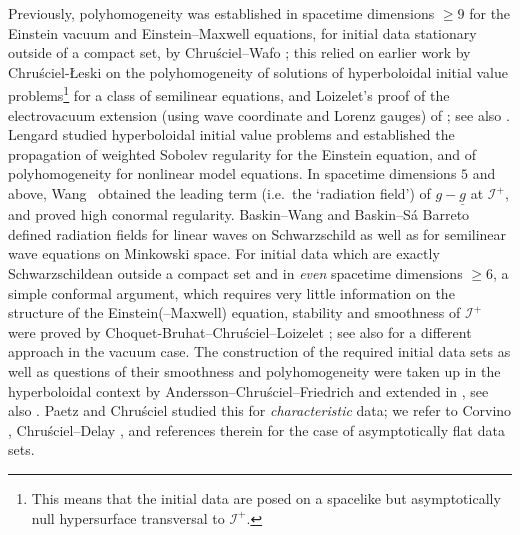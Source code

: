 \documentclass[reqno,11pt,letterpaper]{amsart}
\numberwithin{equation}{section}
\numberwithin{figure}{section}
\theoremstyle{definition}
\theoremstyle{remark}
\newcommand{\ms}{\mathscr}
\newcommand{\scri}{\ms I}
\newcommand{\ul}[1]{\underline{#1}{}}
\begin{document}
Previously, polyhomogeneity was established in spacetime dimensions $\geq 9$ for the Einstein vacuum and Einstein--Maxwell equations, for initial data stationary outside of a compact set, by Chru\'sciel--Wafo \cite{ChruscielWafoPhg}; this relied on earlier work by Chru\'sciel-\L{}eski \cite{ChruscielLeskiPolyhomogeneous} on the polyhomogeneity of solutions of hyperboloidal initial value problems\footnote{This means that the initial data are posed on a spacelike but asymptotically null hypersurface transversal to $\scri^+$.} for a class of semilinear equations, and Loizelet's proof \cite{LoizeletPhD,LoizeletEinsteinMaxwell} of the electrovacuum extension (using wave coordinate and Lorenz gauges) of \cite{LindbladRodnianskiGlobalExistence}; see also \cite{BeigChruscielElectroVac}. Lengard \cite{LengardThesis} studied hyperboloidal initial value problems and established the propagation of weighted Sobolev regularity for the Einstein equation, and of polyhomogeneity for nonlinear model equations. In spacetime dimensions $5$ and above, Wang~\cite{WangThesis,WangRadiation} obtained the leading term (i.e.\ the `radiation field') of $g-\ul g$ at $\scri^+$, and proved high conormal regularity. Baskin--Wang \cite{BaskinWangRad} and Baskin--S\'a Barreto \cite{BaskinSaBarretoRad} defined radiation fields for linear waves on Schwarzschild as well as for semilinear wave equations on Minkowski space. For initial data which are exactly Schwarzschildean outside a compact set and in \emph{even} spacetime dimensions $\geq 6$, a simple conformal argument, which requires very little information on the structure of the Einstein(--Maxwell) equation, stability and smoothness of $\scri^+$ were proved by Choquet-Bruhat--Chru\'sciel--Loizelet \cite{ChoquetBruhatChruscielLoizeletEinsteinMaxwell}; see also \cite{AndersonChruscielSimple} for a different approach in the vacuum case. The construction of the required initial data sets as well as questions of their smoothness and polyhomogeneity were taken up in the hyperboloidal context by Andersson--Chru\'sciel--Friedrich \cite{AnderssonChruscielFriedrich} and extended in \cite{AnderssonChruscielHypPhg,AnderssonChruscielHyp}, see also \cite{ChruscielLengardPhg}. Paetz and Chru\'sciel \cite{ChruscielPaetzCharScriI,PaetzCharScriII} studied this for \emph{characteristic} data; we refer to Corvino \cite{CorvinoScalar}, Chru\'sciel--Delay \cite{ChruscielDelayMapping}, and references therein for the case of asymptotically flat data sets.
\end{document}
